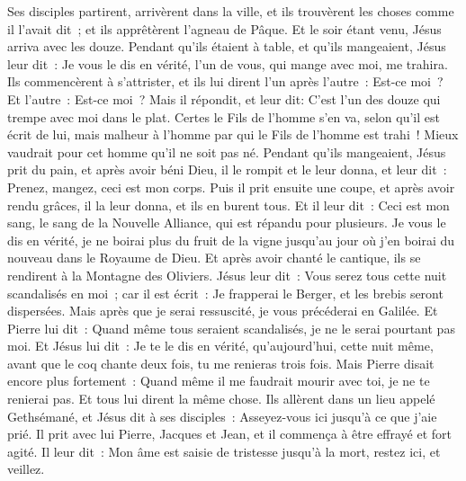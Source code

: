 \begin{multicols}{2}
Ses disciples partirent, arrivèrent dans la ville, et ils trouvèrent les choses comme il l'avait dit~; et ils apprêtèrent l'agneau de Pâque.
Et le soir étant venu, Jésus arriva avec les douze.
Pendant qu'ils étaient à table, et qu'ils mangeaient, Jésus leur dit~: Je vous le dis en vérité, l'un de vous, qui mange avec moi, me trahira.
Ils commencèrent à s'attrister, et ils lui dirent l'un après l'autre~: Est-ce moi~? Et l'autre~: Est-ce moi~?
Mais il répondit, et leur dit: C'est l'un des douze qui trempe avec moi dans le plat.
Certes le Fils de l'homme s'en va, selon qu'il est écrit de lui, mais malheur à l'homme par qui le Fils de l'homme est trahi~! Mieux vaudrait pour cet homme qu'il ne soit pas né.
Pendant qu'ils mangeaient, Jésus prit du pain, et après avoir béni Dieu, il le rompit et le leur donna, et leur dit~: Prenez, mangez, ceci est mon corps.
Puis il prit ensuite une coupe, et après avoir rendu grâces, il la leur donna, et ils en burent tous.
Et il leur dit~: Ceci est mon sang, le sang de la Nouvelle Alliance, qui est répandu pour plusieurs.
Je vous le dis en vérité, je ne boirai plus du fruit de la vigne jusqu'au jour où j'en boirai du nouveau dans le Royaume de Dieu.
Et après avoir chanté le cantique, ils se rendirent à la Montagne des Oliviers.
Jésus leur dit~: Vous serez tous cette nuit scandalisés en moi~; car il est écrit~: Je frapperai le Berger, et les brebis seront dispersées.
Mais après que je serai ressuscité, je vous précéderai en Galilée.
Et Pierre lui dit~: Quand même tous seraient scandalisés, je ne le serai pourtant pas moi.
Et Jésus lui dit~: Je te le dis en vérité, qu'aujourd'hui, cette nuit même, avant que le coq chante deux fois, tu me renieras trois fois.
Mais Pierre disait encore plus fortement~: Quand même il me faudrait mourir avec toi, je ne te renierai pas. Et tous lui dirent la même chose.
Ils allèrent dans un lieu appelé Gethsémané, et Jésus dit à ses disciples~: Asseyez-vous ici jusqu'à ce que j'aie prié.
Il prit avec lui Pierre, Jacques et Jean, et il commença à être effrayé et fort agité.
Il leur dit~: Mon âme est saisie de tristesse jusqu'à la mort, restez ici, et veillez.

\end{multicols}
